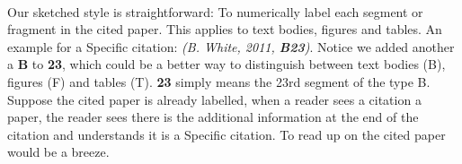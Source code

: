 \paragraph{}
Our sketched style is straightforward: To numerically label each segment or fragment in the cited paper. This applies to text bodies, figures and tables. An example for a Specific citation: \textit{(B. White, 2011, \textbf{B23})}. Notice we added another a \textbf{B} to \textbf{23}, which could be a better way to distinguish between text bodies (B), figures (F) and tables (T). \textbf{23} simply means the 23rd segment of the type B. Suppose the cited paper is already labelled, when a reader sees a citation a paper, the reader sees there is the additional information at the end of the citation and understands it is a Specific citation. To read up on the cited paper would be a breeze.
